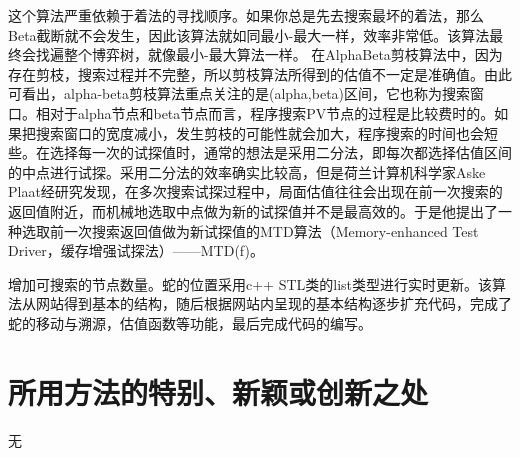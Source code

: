 \documentclass{ctexrep}
\begin{document}
这个算法严重依赖于着法的寻找顺序。如果你总是先去搜索最坏的着法，那么Beta截断就不会发生，因此该算法就如同最小-最大一样，效率非常低。该算法最终会找遍整个博弈树，就像最小-最大算法一样。
在AlphaBeta剪枝算法中，因为存在剪枝，搜索过程并不完整，所以剪枝算法所得到的估值不一定是准确值。由此可看出，alpha-beta剪枝算法重点关注的是(alpha,beta)区间，它也称为搜索窗口。相对于alpha节点和beta节点而言，程序搜索PV节点的过程是比较费时的。如果把搜索窗口的宽度减小，发生剪枝的可能性就会加大，程序搜索的时间也会短些。在选择每一次的试探值时，通常的想法是采用二分法，即每次都选择估值区间的中点进行试探。采用二分法的效率确实比较高，但是荷兰计算机科学家Aske Plaat经研究发现，在多次搜索试探过程中，局面估值往往会出现在前一次搜索的返回值附近，而机械地选取中点做为新的试探值并不是最高效的。于是他提出了一种选取前一次搜索返回值做为新试探值的MTD算法（Memory-enhanced Test Driver，缓存增强试探法）——MTD(f)。

增加可搜索的节点数量。蛇的位置采用c++ STL类的list类型进行实时更新。该算法从网站得到基本的结构，随后根据网站内呈现的基本结构逐步扩充代码，完成了蛇的移动与溯源，估值函数等功能，最后完成代码的编写。

\section{所用方法的特别、新颖或创新之处}
无
\end{document}
